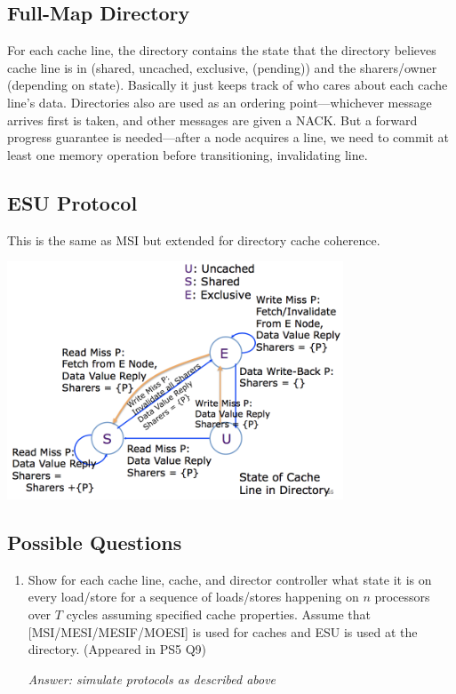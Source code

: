 \documentclass{article}
\begin{document}
\subsection{Full-Map Directory}

For each cache line, the directory contains the state that the directory believes cache line is in (shared, uncached, exclusive, (pending)) and the sharers/owner (depending on state). Basically it just keeps track of who cares about each cache line's data. Directories also are used as an ordering point---whichever message arrives first is taken, and other messages are given a NACK. But a forward progress guarantee is needed---after a node acquires a line, we need to commit at least one memory operation before transitioning, invalidating line.

\subsection{ESU Protocol}

This is the same as MSI but extended for directory cache coherence.
\begin{center}
\includegraphics[width=0.75\textwidth]{esu}
\end{center}

\subsection{Possible Questions}

\begin{enumerate}

\item Show for each cache line, cache, and director controller what state it is on every load/store for a sequence of loads/stores happening on $n$ processors over $T$ cycles assuming specified cache properties. Assume that [MSI/MESI/MESIF/MOESI] is used for caches and ESU is used at the directory. (Appeared in PS5 Q9)

\textit{Answer: simulate protocols as described above}

\end{enumerate}
\end{document}

